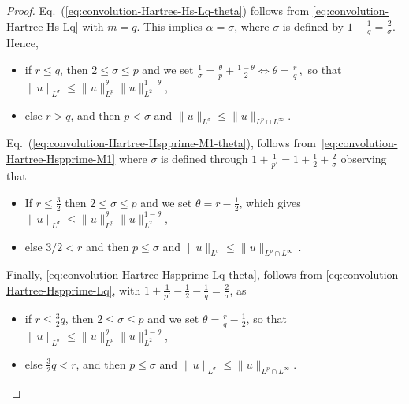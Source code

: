 \documentclass[12pt]{article}
\theoremstyle{plain}
\begin{document}
\begin{proof}
Eq.~(\ref{eq:convolution-Hartree-Hs-Lq-theta}) follows from \eqref{eq:convolution-Hartree-Hs-Lq} with $m=q$. This implies $\alpha = \sigma$, 
where $\sigma$ is defined by $1-\frac{1}{q}=\frac{2}{\sigma}$. Hence, 
\begin{itemize}
\item if $r\leq q$, then $2\leq\sigma\leq p$ and we set
$
\frac{1}{\sigma}=\frac{\theta}{p}+\frac{1-\theta}{2}\Leftrightarrow\theta=\frac{r}{q}\,,
$
so that $\|u\|_{L^{\sigma}}\leq\|u\|_{L^{p}}^{\theta}\|u\|_{L^{2}}^{1-\theta}$,
\item else $r>q$, and then $p<\sigma$ and $\|u\|_{L^{\sigma}}\leq\|u\|_{L^{p}\cap L^{\infty}}$.
\end{itemize}

Eq.~(\ref{eq:convolution-Hartree-Hspprime-M1-theta}), follows from~\eqref{eq:convolution-Hartree-Hspprime-M1} where $\sigma$ is defined through $1+\frac{1}{p'}=1+\frac{1}{2}+\frac{2}{\sigma}$ observing that
\begin{itemize}
\item If $r\leq \frac32$ then $2\leq\sigma\leq p$ and we set 
$\theta=r-\frac12$,
which gives $\|u\|_{L^{\sigma}}\leq\|u\|_{L^{p}}^{\theta}\|u\|_{L^{2}}^{1-\theta}$,
\item else $3/2<r$ and then $p\leq\sigma$ and $\|u\|_{L^{\sigma}}\leq\|u\|_{L^{p}\cap L^{\infty}}$\,.
\end{itemize}

Finally, \eqref{eq:convolution-Hartree-Hspprime-Lq-theta}, follows from \eqref{eq:convolution-Hartree-Hspprime-Lq}, with
$1+\frac{1}{p'}-\frac{1}{2}-\frac{1}{q}=\frac{2}{\sigma}$, as
\begin{itemize}
\item if $r\leq\frac{3}{2}q$, then $2\leq\sigma\leq p$ and we set
$\theta=\frac{r}{q}-\frac{1}{2}$, so that $\|u\|_{L^{\sigma}}\leq\|u\|_{L^{p}}^{\theta}\|u\|_{L^{2}}^{1-\theta}$,
\item else $\frac{3}{2}q<r$, and then $p\leq\sigma$ and $\|u\|_{L^{\sigma}}\leq\|u\|_{L^{p}\cap L^{\infty}}$.\qedhere
\end{itemize}
\end{proof}
\end{document}
